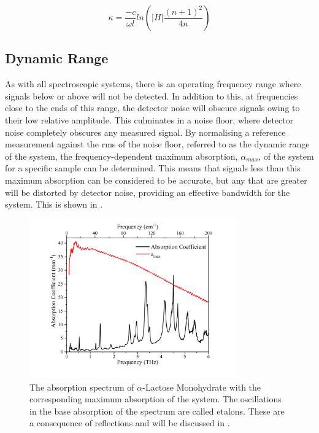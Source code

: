 \begin{equation}
\kappa = \frac{-c}{\omega l} ln\left(|H|\frac{(n+1)^2}{4n}\right)
\end{equation}

\subsection{Dynamic Range}
As with all spectroscopic systems, there is an operating frequency range where signals below or above will not be detected. In addition to this, at frequencies close to the ends of this range, the detector noise will obscure signals owing to their low relative amplitude. This culminates in a noise floor, where detector noise completely obscures any measured signal. By normalising a reference measurement against the \acrfull{rms} of the noise floor, referred to as the dynamic range of the system, the frequency\nobreakdash-dependent maximum absorption, \(\alpha_{max}\), of the system for a specific sample can be determined. This means that signals less than this maximum absorption can be considered to be accurate, but any that are greater will be distorted by detector noise, providing an effective bandwidth for the system. This is shown in .

\begin{figure}
    \centering
    \includegraphics[width=0.8\textwidth]{Figures/Spectra/AbsCoGNeat.png}
    \captionsetup{font = footnotesize, justification = centering}
    \caption[The Absorption Spectrum of \(\alpha\)-Lactose Monohydrate with the corresponding Maximum Absorption of the System]{The absorption spectrum of \(\alpha\)-Lactose Monohydrate with the corresponding maximum absorption of the system. The oscillations in the base absorption of the spectrum are called etalons. These are a consequence of reflections and will be discussed in .}
    \label{fig:my_absconeat}
\end{figure}

